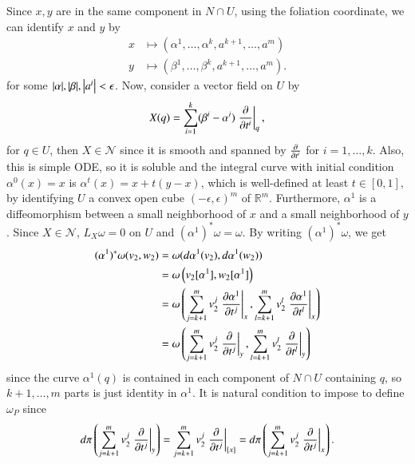 \documentclass[a4paper, 12pt]{article}
\theoremstyle{Mydefinition}
\theoremstyle{Mytheorem}
\begin{document}
\begin{enumerate}
    Since $x,y$ are in the same component in $N\cap U$, using the foliation coordinate, we can identify $x$ and $y$ by
    \begin{equation*}
    \begin{split}
        x&\mapsto \left(\alpha^1, \ldots, \alpha^k, a^{k+1}, \ldots, a^{m}\right)\\
        y&\mapsto \left(\beta^1, \ldots, \beta^k, a^{k+1}, \ldots, a^{m}\right).
    \end{split}
    \end{equation*}
    for some $\abs{\alpha},\abs{\beta}, \abs{a^i}<\epsilon$. Now, consider a vector field on $U$ by
    \begin{equation*}
        X(q) = \sum_{i=1}^k (\beta^i-\alpha^i)\left.\pdv{t^i}\right|_q,
    \end{equation*}
    for $q\in U$, then $X\in\mathcal{N}$ since it is smooth and spanned by $\pdv{t^i}$ for $i=1,\ldots, k$. Also, this is simple ODE, so it is soluble and the integral curve with initial condition $\alpha^0(x) = x$ is $\alpha^t(x) = x + t(y-x)$, which is well-defined at least $t\in [0,1]$, by identifying $U$ a convex open cube $(-\epsilon, \epsilon)^m$ of $\mathbb{R}^m$. Furthermore, $\alpha^1$ is a diffeomorphism between a small neighborhood of $x$ and a small neighborhood of $y$. Since $X\in\mathcal{N}$, $L_X\omega = 0$ on $U$ and $(\alpha^1)^*\omega = \omega$. By writing $(\alpha^1)^*\omega$, we get
    \begin{equation*}
        \begin{split}
            (\alpha^1)^*\omega(v_2, w_2) &= \omega(d\alpha^1(v_2), d\alpha^1(w_2)) \\
            &=\omega\left(v_2[\alpha^1], w_2[\alpha^1]\right)\\
            &=\omega\left(\sum_{j=k+1}^m v^j_2 \left.\pdv{\alpha^1}{t^j}\right|_{x}, \sum_{l=k+1}^m v^l_2 \left.\pdv{\alpha^1}{t^l}\right|_{x}\right)\\
            &=\omega\left(\sum_{j=k+1}^m v^j_2 \left.\pdv{t^j}\right|_{y}, \sum_{l=k+1}^m v^l_2 \left.\pdv{t^l}\right|_{y}\right)
        \end{split}
    \end{equation*}
    since the curve $\alpha^1(q)$ is contained in each component of $N\cap U$ containing $q$, so $k+1, \ldots, m$ parts is just identity in $\alpha^1$. It is natural condition to impose to define $\omega_P$ since 
    \begin{equation*}
        d\pi\left(\sum_{j=k+1}^m v^j_2 \left.\pdv{t^j}\right|_{y}\right) = \sum_{j=k+1}^m v^j_2 \left.\pdv{t^j}\right|_{[x]} = d\pi\left(\sum_{j=k+1}^m v^j_2 \left.\pdv{t^j}\right|_{x}\right).
    \end{equation*}
    

\end{enumerate}
\end{document}
